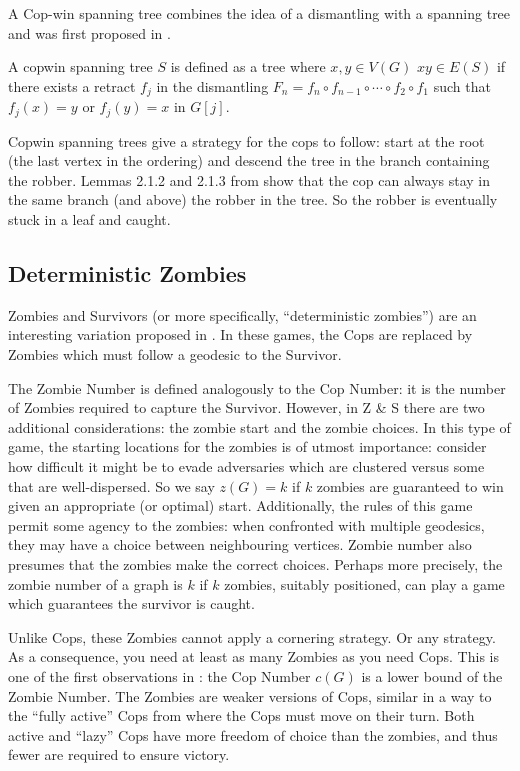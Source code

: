 A Cop-win spanning tree combines the idea of a dismantling with a spanning tree
and was first proposed in \cite{clarke2002constrained}.

A copwin spanning tree $S$ is defined as a tree where $x,y\in V(G)$
$xy \in E(S)$ if there exists a retract $f_j$ in the dismantling
$F_n = f_{n} \circ f_{n-1} \circ \cdots \circ f_{2} \circ f_1$
such that $f_j (x) = y$ or $f_j (y) = x$ in $G[j]$.

Copwin spanning trees give a strategy for the cops to follow: start at the root
(the last vertex in the ordering) and descend the tree in the branch containing the robber.
Lemmas 2.1.2 and 2.1.3 from \cite{clarke2002constrained} show that the cop
can always stay in the same branch (and above) the robber in the tree. So the
robber is eventually stuck in a leaf and caught.

\subsection{Deterministic Zombies}

Zombies and Survivors (or more specifically, ``deterministic zombies'') are an interesting variation proposed in \cite{fitzpatrick2016deterministic}. In these games, the
Cops are replaced by Zombies which must follow a geodesic to the Survivor.

The Zombie Number is defined analogously to the Cop Number: it is the number of Zombies
required to capture the Survivor. However, in Z \& S there are two additional considerations:
the zombie start and the zombie choices.
In this type of game, the starting locations for the zombies is of utmost importance:
consider how difficult it might be to evade adversaries which are clustered versus some
that are well-dispersed. So we say $z(G) = k$ if $k$ zombies are guaranteed to win
given an appropriate (or optimal) start. Additionally, the rules of this game permit
some agency to the zombies: when confronted with multiple geodesics, they may have
a choice between neighbouring vertices. Zombie number also presumes that
the zombies make the correct choices. Perhaps more precisely, the zombie number of a
graph is $k$ if $k$ zombies, suitably positioned, can play a game which guarantees the survivor
is caught.

Unlike Cops, these Zombies cannot apply a cornering strategy. Or any strategy.
As a consequence, you need at least as many Zombies as you need Cops.
This is one of the first observations
in \cite{fitzpatrick2016deterministic}: the Cop Number $c(G)$ is a lower bound of the Zombie Number. The Zombies are weaker versions of Cops, similar in a way to the ``fully active'' Cops from \cite{gromovikov2018fully} where the Cops must move on their turn. Both
active and ``lazy'' Cops have more freedom of choice than the zombies, and thus
fewer are required to ensure victory.

